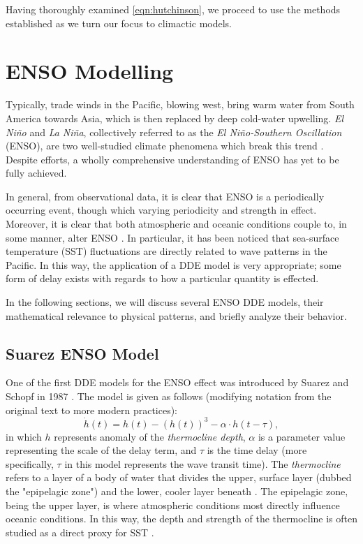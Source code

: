 \documentclass[12pt]{article}
\begin{document}
Having thoroughly examined \cref{eqn:hutchinson}, we proceed to use the methods established as we turn our focus to climactic models.
\newpage

\section{ENSO Modelling}

Typically, trade winds in the Pacific, blowing west, bring warm water from South America towards Asia, which is then replaced by deep cold-water upwelling. \emph{El Niño} and \emph{La Niña}, collectively referred to as the \emph{El Niño-Southern Oscillation} (ENSO), are two well-studied climate phenomena which break this trend \cite{aboutelnino}. Despite efforts, a wholly comprehensive understanding of ENSO has yet to be fully achieved.

In general, from observational data, it is clear that ENSO is a periodically occurring event, though which varying periodicity and strength in effect. Moreover, it is clear that both atmospheric and oceanic conditions couple to, in some manner, alter ENSO \cite{climatedde}. In particular, it has been noticed that sea-surface temperature (SST) fluctuations are directly related to wave patterns in the Pacific. In this way, the application of a DDE model is very appropriate; some form of delay exists with regards to how a particular quantity is effected.

In the following sections, we will discuss several ENSO DDE models, their mathematical relevance to physical patterns, and briefly analyze their behavior.

\subsection{Suarez ENSO Model}

One of the first DDE models for the ENSO effect was introduced by Suarez and Schopf in 1987 \cite{ensomodel}. The model is given as follows (modifying notation from the original text to more modern practices):
\begin{equation}\label{eqn:daoensomodel}
    \dot{h}(t) = h(t) - \left(h(t)\right)^3 - \alpha\cdot  h(t - \tau),
\end{equation}
in which $h$ represents anomaly of the \emph{thermocline depth}, $\alpha$ is a parameter value representing the scale of the delay term, and $\tau$ is the time delay (more specifically, $\tau$ in this model represents the wave transit time). The \emph{thermocline} refers to a layer of a body of water that divides the upper, surface layer (dubbed the "epipelagic zone") and the lower, cooler layer beneath \cite{thermocline}. The epipelagic zone, being the upper layer, is where atmospheric conditions most directly influence oceanic conditions. In this way, the depth and strength of the thermocline is often studied as a direct proxy for SST \cite{randomnino}\cite{climatedde}.
\end{document}
